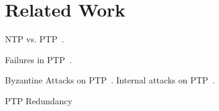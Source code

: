 
\section{Related Work}

NTP vs. PTP~\cite{ntp-vs-ptp}.

Failures in PTP~\cite{ptp-failures}.

Byzantine Attacks on PTP~\cite{byzantine-ptp}. Internal attacks on PTP~\cite{ptp-internal-attacks}.

PTP Redundancy~\cite{ptp-redundancy}
